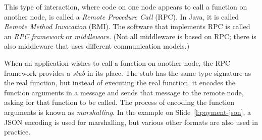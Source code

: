 This type of interaction, where code on one node appears to call a function on another node, is called a \emph{Remote Procedure Call} (RPC).
In Java, it is called \emph{Remote Method Invocation} (RMI).
The software that implements RPC is called an \emph{RPC framework} or \emph{middleware}.
(Not all middleware is based on RPC; there is also middleware that uses different communication models.)

When an application wishes to call a function on another node, the RPC framework provides a \emph{stub} in its place.
The stub has the same type signature as the real function, but instead of executing the real function, it encodes the function arguments in a message and sends that message to the remote node, asking for that function to be called.
The process of encoding the function arguments is known as \emph{marshalling}.
In the example on Slide~\ref{l:payment-json}, a JSON encoding is used for marshalling, but various other formats are also used in practice.

